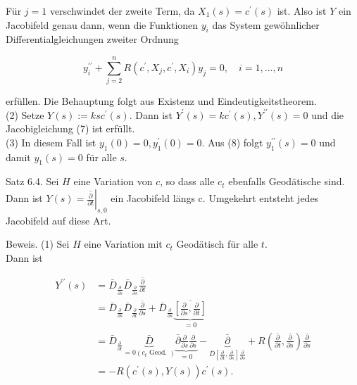 \documentclass[10pt, letterpaper]{article}
\begin{document}
Für $j=1$ verschwindet der zweite Term, da $X_{1}(s)=c^{\prime}(s)$ ist. Also ist $Y$ ein Jacobifeld genau dann, wenn die Funktionen $y_{i}$ das System gewöhnlicher Differentialgleichungen zweiter Ordnung


\begin{equation*}
y_{i}^{\prime \prime}+\sum_{j=2}^{n} R\left(c^{\prime}, X_{j}, c^{\prime}, X_{i}\right) y_{j}=0, \quad i=1, \ldots, n \tag{8}
\end{equation*}


erfüllen. Die Behauptung folgt aus Existenz und Eindeutigkeitstheorem.\\
(2) Setze $Y(s):=k s c^{\prime}(s)$. Dann ist $Y^{\prime}(s)=k c^{\prime}(s), Y^{\prime \prime}(s)=0$ und die Jacobigleichung (7) ist erfüllt.\\
(3) In diesem Fall ist $y_{1}(0)=0, y_{1}^{\prime}(0)=0$. Aus (8) folgt $y_{1}^{\prime \prime}(s)=0$ und damit $y_{1}(s)=0$ für alle $s$.

Satz 6.4. Sei $H$ eine Variation von $c$, so dass alle $c_{t}$ ebenfalls Geodätische sind. Dann ist $Y(s)=\left.\overline{\frac{\partial}{\partial t}}\right|_{s, 0}$ ein Jacobifeld längs c. Umgekehrt entsteht jedes Jacobifeld auf diese Art.

Beweis. (1) Sei $H$ eine Variation mit $c_{t}$ Geodätisch für alle $t$.\\
Dann ist

$$
\begin{aligned}
Y^{\prime \prime}(s) & =\bar{D}_{\frac{\partial}{\partial s}} \bar{D}_{\frac{\partial}{\partial s}} \frac{\bar{\partial}}{\partial t} \\
& =\bar{D}_{\frac{\partial}{\partial s}} \bar{D}_{\frac{\partial}{\partial t}} \frac{\bar{\partial}}{\partial s}+\bar{D}_{\frac{\partial}{\partial s}} \underbrace{\overline{\left[\frac{\partial}{\partial s}, \frac{\partial}{\partial t}\right]}}_{=0} \\
& =\bar{D}_{\frac{\partial}{\partial t}} \underbrace{\bar{D}}_{=0\left(c_{t} \text { Geod. }\right)} \underbrace{\bar{\partial} \frac{\partial}{\partial s} \frac{\partial}{\partial s}}_{=0}-\underbrace{\bar{\partial}}_{\bar{D}\left[\frac{\partial}{\partial t}, \frac{\partial}{\partial s}\right] \frac{\partial}{\partial s}}+R\left(\frac{\bar{\partial}}{\partial t}, \frac{\bar{\partial}}{\partial s}\right) \frac{\bar{\partial}}{\partial s} \\
& =-R\left(c^{\prime}(s), Y(s)\right) c^{\prime}(s) .
\end{aligned}
$$
\end{document}
